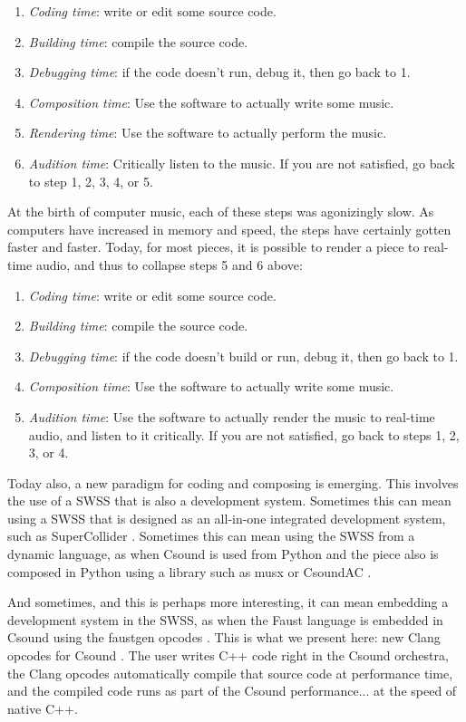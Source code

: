 \documentclass[letterpaper, 12pt]{article}
\begin{document}
\begin{enumerate}
\item \textit{Coding time}: write or edit some source code.
\item \textit{Building time}: compile the source code.
\item \textit{Debugging time}: if the code doesn't run, debug it, then go back to 1.
\item \textit{Composition time}: Use the software to actually write some music.
\item \textit{Rendering time}: Use the software to actually perform the music.
\item \textit{Audition time}: Critically listen to the music. If you are not satisfied, go back to step 1, 2, 3, 4, or 5.
\end{enumerate}

\noindent At the birth of computer music, each of these steps was agonizingly slow. As computers have increased in memory and speed, the steps have certainly gotten faster and faster. Today, for most pieces, it is possible to render a piece to real-time audio, and thus to collapse steps 5 and 6 above:

\begin{enumerate}
\item \textit{Coding time}: write or edit some source code.
\item \textit{Building time}: compile the source code.
\item \textit{Debugging time}: if the code doesn't build or run, debug it, then go back to 1.
\item \textit{Composition time}: Use the software to actually write some music.
\item \textit{Audition time}: Use the software to actually render the music to real-time audio, and listen to it critically. If you are not satisfied, go back to steps 1, 2, 3, or 4.
\end{enumerate}
	Today also, a new paradigm for coding and composing is emerging. This involves the use of a SWSS that is also a development system. Sometimes this can mean using a SWSS that is designed as an all-in-one integrated development system, such as SuperCollider \citep{supercollider}. Sometimes this can mean using the SWSS from a dynamic language, as when Csound \citep{csoundmain, csoundbook} is used from Python \citep{python} and the piece also is composed in Python using a library such as musx \citep{musx} or CsoundAC \citep{csoundextended}.

	And sometimes, and this is perhaps more interesting, it can mean embedding a development system in the SWSS, as when the Faust language \citep{faustdsp} is embedded in Csound using the faustgen opcodes \cite{faustgen}. This is what we present here: new Clang opcodes for Csound \citep{clangpcodes}. The user writes C++ code right in the Csound orchestra, the Clang opcodes automatically compile that source code at performance time, and the compiled code runs as part of the Csound performance... at the speed of native C++.
\end{document}
